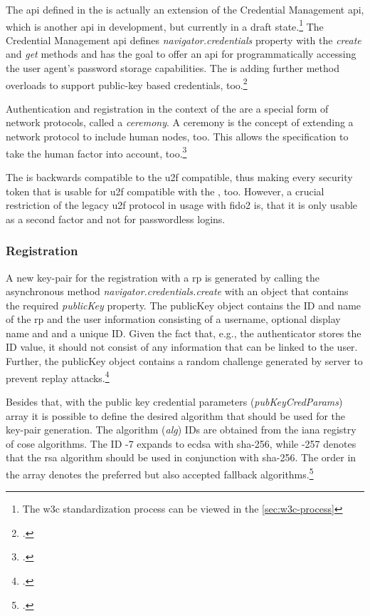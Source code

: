 The \gls{api} defined in the \wa{} is actually an extension of the Credential Management \gls{api}, which is another \gls{api} in development, but currently in a draft state.\footnote{The \gls{w3c} standardization process can be viewed in the \autoref{sec:w3c-process}} The Credential Management \gls{api} defines \textit{navigator.credentials} property with the \textit{create} and \textit{get} methods and has the goal to offer an \gls{api} for programmatically accessing the user agent's password storage capabilities. The \wa{} is adding further method overloads to support public-key based credentials, too.\footcites[See][Chapter 1]{w3c}[See][Chapter 1.1]{w3c-credentials}

Authentication and registration in the context of the \wa{} are a special form of network protocols, called a \textit{ceremony}. A ceremony is the concept of extending a network protocol to include human nodes, too. This allows the specification to take the human factor into account, too.\footcite[See][2]{Ellison2007CeremonyDA}

The \wa{} is backwards compatible to the \gls{u2f} compatible, thus making every security token that is usable for \gls{u2f} compatible with the \wa, too. However, a crucial restriction of the legacy \gls{u2f} protocol in usage with \gls{fido}2 is, that it is only usable as a second factor and not for passwordless logins.

\subsubsection{Registration}

A new key-pair for the registration with a \gls{rp} is generated by calling the asynchronous method \textit{navigator.credentials.create} with an object that contains the required \textit{publicKey} property. The publicKey object contains the ID and name of the \gls{rp} and the user information consisting of a username, optional display name and and a unique ID. Given the fact that, e.g., the authenticator stores the ID value, it should not consist of any information that can be linked to the user. Further, the publicKey object contains a random challenge generated by server to prevent replay attacks.\footcites[See][Chapter 5.1.3]{w3c}

Besides that, with the public key credential parameters (\textit{pubKeyCredParams}) array it is possible to define the desired algorithm that should be used for the key-pair generation. The algorithm (\textit{alg}) IDs are obtained from the \gls{iana} registry of \gls{cose} algorithms. The ID -7 expands to \gls{ecdsa} with \gls{sha}-256, while -257 denotes that the \gls{rsa} algorithm should be used in conjunction with \gls{sha}-256. The order in the array denotes the preferred but also accepted fallback algorithms.\footcites[See][Chapter 5.3, 11.3]{w3c}

